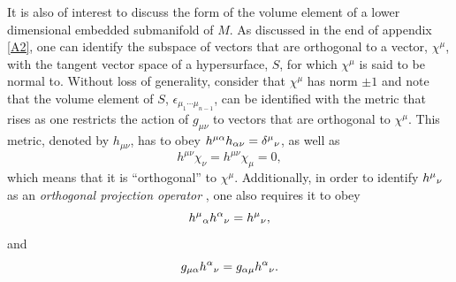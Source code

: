 \documentclass[
12pt,		%
openright,	%
twoside,  %
a4paper,			%
chapter=TITLE,		%
english,			%
french,				%
spanish,			%
brazil				%
]{USPSC-classe/USPSC}
\begin{document}
\begin{apendicesenv}
It is also of interest to discuss the form of the volume element of a lower dimensional embedded submanifold of $M$. As discussed in the end of appendix \ref{A2}, one can identify the subspace of vectors that are orthogonal to a vector, $\chi^{\mu}$, with the tangent vector space of a hypersurface, $S$, for which $\chi^{\mu}$ is said to be normal to. Without loss of generality, consider that $\chi^{\mu}$ has norm $\pm1$ and note that the volume element of $S$, $\epsilon_{\mu_1\cdots\mu_{n-1}}$, can be identified with the metric that rises as one restricts the action of $g_{\mu\nu}$ to vectors that are orthogonal to $\chi^{\mu}$. This metric, denoted by $h_{\mu\nu}$, has to obey $h^{\mu\alpha}h_{\alpha\nu}=\delta^{\mu}\mathstrut_{\nu}$, as well as
\begin{equation}\label{eq345}
    h^{\mu\nu}\chi_{\nu}=h^{\mu\nu}\chi_{\mu}=0,
\end{equation}
which means that it is ``orthogonal'' to $\chi^{\mu}$. Additionally, in order to identify $h^{\mu}\mathstrut_{\nu}$ as an \textit{orthogonal projection operator} \cite{Horn2013}, one also requires it to obey
\begin{equation}\label{eq3456}
    h^{\mu}\mathstrut_{\alpha}h^{\alpha}\mathstrut_{\nu}=h^{\mu}\mathstrut_{\nu},
\end{equation}
and
\begin{equation}\label{eq34567}
    g_{\mu\alpha}h^{\alpha}\mathstrut_{\nu}=g_{\alpha\mu}h^{\alpha}\mathstrut_{\nu}.
\end{equation}


\end{apendicesenv}
\end{document}
